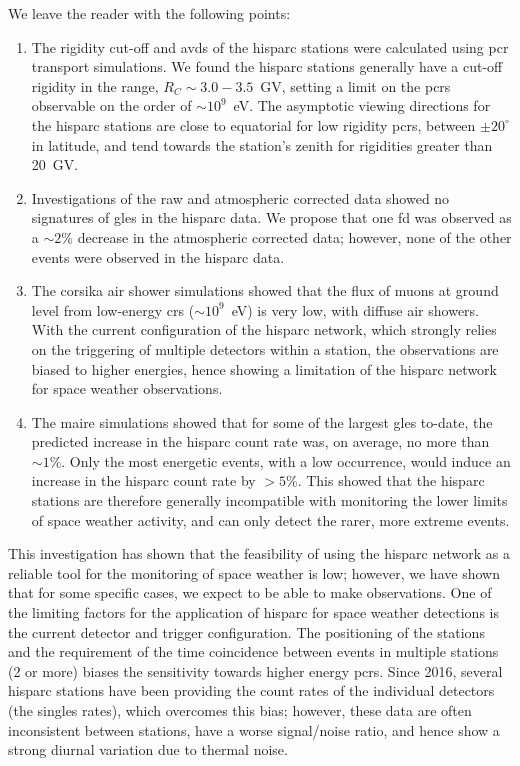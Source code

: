 We leave the reader with the following points:

\begin{enumerate}
	\item{The rigidity cut-off and \glspl{avd} of the \gls{hisparc} stations were calculated using \gls{pcr} transport simulations. We found the \gls{hisparc} stations generally have a cut-off rigidity in the range, $R_C \sim 3.0 - 3.5$~GV, setting a limit on the \glspl{pcr} observable on the order of $\sim 10^9$~eV. The asymptotic viewing directions for the \gls{hisparc} stations are close to equatorial for low rigidity \glspl{pcr}, between $\pm 20^{\circ}$ in latitude, and tend towards the station's zenith for rigidities greater than 20~GV.}
		
	\item{Investigations of the raw and atmospheric corrected data showed no signatures of \glspl{gle} in the \gls{hisparc} data. We propose that one \gls{fd} was observed as a $\sim 2\%$ decrease in the atmospheric corrected data; however, none of the other events were observed in the \gls{hisparc} data.}
	
	\item{The \gls{corsika} air shower simulations showed that the flux of muons at ground level from low-energy \glspl{cr} ($\sim 10^9$~eV) is very low, with diffuse air showers. With the current configuration of the \gls{hisparc} network, which strongly relies on the triggering of multiple detectors within a station, the observations are biased to higher energies, hence showing a limitation of the \gls{hisparc} network for space weather observations.}

	\item{The \gls{maire} simulations showed that for some of the largest \glspl{gle} to-date, the predicted increase in the \gls{hisparc} count rate was, on average, no more than $\sim 1\%$. Only the most energetic events, with a low occurrence, would induce an increase in the \gls{hisparc} count rate by $>5\%$. This showed that the \gls{hisparc} stations are therefore generally incompatible with monitoring the lower limits of space weather activity, and can only detect the rarer, more extreme events.}

\end{enumerate}

This investigation has shown that the feasibility of using the \gls{hisparc} network as a reliable tool for the monitoring of space weather is low; however, we have shown that for some specific cases, we expect to be able to make observations. One of the limiting factors for the application of \gls{hisparc} for space weather detections is the current detector and trigger configuration. The positioning of the stations and the requirement of the time coincidence between events in multiple stations (2 or more) biases the sensitivity towards higher energy \glspl{pcr}. Since 2016, several \gls{hisparc} stations have been providing the count rates of the individual detectors (the singles rates), which overcomes this bias; however, these data are often inconsistent between stations, have a worse signal/noise ratio, and hence show a strong diurnal variation due to thermal noise. 


